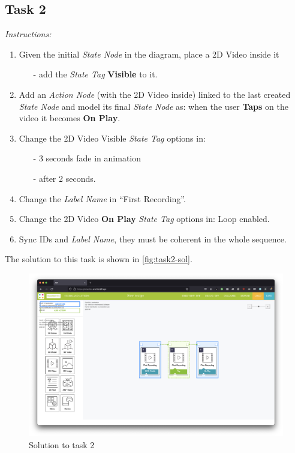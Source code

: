 \subsection*{Task 2}
\textit{Instructions:} 
\begin{enumerate}
    \item Given the initial \textit{State Node} in the diagram, place a 2D Video inside it
        \begin{itemize}
            \item[-] add the \textit{State Tag} \textbf{Visible} to it.
        \end{itemize}
    \item Add an \textit{Action Node} (with the 2D Video inside) linked to the last created \textit{State Node} and model its final \textit{State Node} as: when the user \textbf{Taps} on the video it becomes \textbf{On Play}.
    \item Change the 2D Video Visible \textit{State Tag} options in:
        \begin{itemize}
            \item[-] 3 seconds fade in animation
            \item[-] after 2 seconds.
        \end{itemize}
    \item Change the \textit{Label Name} in “First Recording”.
    \item Change the 2D Video \textbf{On Play} \textit{State Tag} options in: Loop enabled.
    \item Sync IDs and \textit{Label Name}, they must be coherent in the whole sequence.
\end{enumerate}
The solution to this task is shown in \autoref{fig:task2-sol}.
\begin{figure}[h]
    \centering
    \includegraphics[width=\linewidth]{Figures/Evaluation/Tasks/task2-sol.png}
    \caption{Solution to task 2}
    \label{fig:task2-sol}
\end{figure}

